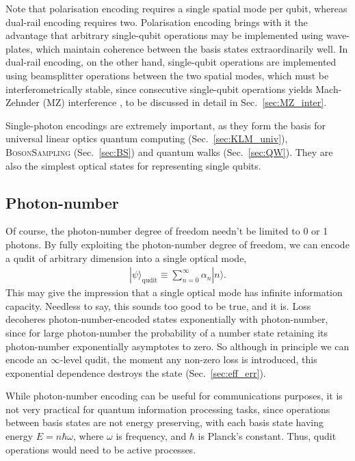 \documentclass[aps, rmp, twocolumn, amsmath, amssymb, nofootinbib, superscriptaddress, longbibliography, floatfix, table-of-contents, eqsecnum]{revtex4-1}
\newcommand{\ket}[1]{|#1\rangle}
\begin{document}
Note that polarisation encoding requires a single spatial mode per qubit, whereas dual-rail encoding requires two. Polarisation encoding brings with it the advantage that arbitrary single-qubit operations may be implemented using wave-plates, which maintain coherence between the basis states extraordinarily well. In dual-rail encoding, on the other hand, single-qubit operations are implemented using beamsplitter operations between the two spatial modes, which must be interferometrically stable, since consecutive single-qubit operations yields Mach-Zehnder (MZ) interference \cite{bib:Zehnder1, bib:Zehnder2}, to be discussed in detail in Sec.~\ref{sec:MZ_inter}.

Single-photon encodings are extremely important, as they form the basis for universal linear optics quantum computing (Sec.~\ref{sec:KLM_univ}), \textsc{BosonSampling} (Sec.~\ref{sec:BS}) and quantum walks (Sec.~\ref{sec:QW}). They are also the simplest optical states for representing single qubits.

%
%

\subsection{Photon-number} 

Of course, the photon-number degree of freedom needn't be limited to 0 or 1 photons. By fully exploiting the photon-number degree of freedom, we can encode a qudit of arbitrary dimension into a single optical mode,
\begin{align} \label{eq:number_qudit}
\ket\psi_\text{qudit} \equiv \sum_{n=0}^\infty \alpha_n \ket{n}.
\end{align}
This may give the impression that a single optical mode has infinite information capacity. Needless to say, this sounds too good to be true, and it is. Loss decoheres photon-number-encoded states exponentially with photon-number, since for large photon-number the probability of a number state retaining its photon-number exponentially asymptotes to zero. So although in principle we can encode an $\infty$-level qudit, the moment any non-zero loss is introduced, this exponential dependence destroys the state (Sec.~\ref{sec:eff_err}).

While photon-number encoding can be useful for communications purposes, it is not very practical for quantum information processing tasks, since operations between basis states are not energy preserving, with each basis state having energy \mbox{$E=n\hbar\omega$}, where $\omega$ is frequency, and $\hbar$ is Planck's constant. Thus, qudit operations would need to be active processes.
\end{document}
